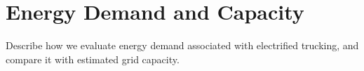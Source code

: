 \section{Energy Demand and Capacity}
\label{sec:demand_capacity}
Describe how we evaluate energy demand associated with electrified trucking, and compare it with estimated grid capacity.